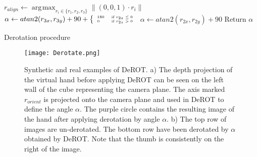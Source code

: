 \documentclass{bmvc2k}
\DeclareMathOperator*{\argmax}{\arg\!\max}
\newcommand{\twopartdef}[4]{
	\left\{
		\begin{array}{ll}
			#1 & \mbox{if } #2 \\
			#3 & \mbox{if } #4
		\end{array}
	\right.
}
\begin{document}
\begin{algorithm}[h]
\scriptsize
\begin{multicols}{2}
\begin{algorithmic}[1]
	\State $r_{align} \leftarrow \argmax_{r_i \in \{r_1,r_2,r_3\}} \|\left(0,0,1\right)\cdot r_i\|$
	   \State $\alpha \leftarrow atan2(r_{3x},r_{3y}) + 90 + \tiny \twopartdef {180} {r_{2z} \leq 0} {0} {r_{2z} > 0}$
	\Else
	   \State $\alpha \leftarrow atan2(r_{2x},r_{2y}) + 90$	   
	\EndIf
	\State Return $\alpha$
\EndProcedure
\end{algorithmic}


\caption{Derotation procedure}\label{alg:treebuilder}
\label{alg:derot}
\end{multicols}
\vspace*{-0.3cm}
\end{algorithm}


\begin{figure}[h]
\begin{center}
\texttt{[image: Derotate.png]}
\end{center}
   \caption{\scriptsize \color{blue} Synthetic and real examples of DeROT. a) The depth projection of the virtual hand before applying DeROT can be seen on the left wall of the cube representing the camera plane. The axis marked $r_{orient}$ is projected onto the camera plane and used in DeROT to define the angle $\alpha$. The purple circle contains the resulting image of the hand after applying derotation by angle $\alpha$. b) The top row of images are un-derotated. The bottom row have been derotated by $\alpha$ obtained by DeROT. Note that the thumb is consistently on the right of the image.}
\label{fig:derot}
\end{figure}
\end{document}
